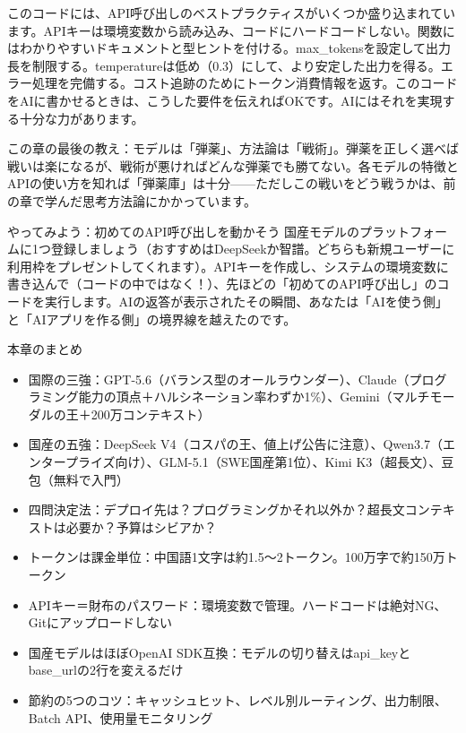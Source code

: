 このコードには、API呼び出しのベストプラクティスがいくつか盛り込まれています。APIキーは環境変数から読み込み、コードにハードコードしない。関数にはわかりやすいドキュメントと型ヒントを付ける。max\_tokensを設定して出力長を制限する。temperatureは低め（0.3）にして、より安定した出力を得る。エラー処理を完備する。コスト追跡のためにトークン消費情報を返す。このコードをAIに書かせるときは、こうした要件を伝えればOKです。AIにはそれを実現する十分な力があります。

この章の最後の教え：モデルは「弾薬」、方法論は「戦術」。弾薬を正しく選べば戦いは楽になるが、戦術が悪ければどんな弾薬でも勝てない。各モデルの特徴とAPIの使い方を知れば「弾薬庫」は十分——ただしこの戦いをどう戦うかは、前の章で学んだ思考方法論にかかっています。

\begin{tcbpractice}{やってみよう：初めてのAPI呼び出しを動かそう}
国産モデルのプラットフォームに1つ登録しましょう（おすすめはDeepSeekか智譜。どちらも新規ユーザーに利用枠をプレゼントしてくれます）。APIキーを作成し、システムの環境変数に書き込んで（コードの中ではなく！）、先ほどの「初めてのAPI呼び出し」のコードを実行します。AIの返答が表示されたその瞬間、あなたは「AIを使う側」と「AIアプリを作る側」の境界線を越えたのです。

\end{tcbpractice}

\begin{tcbsummary}{本章のまとめ}
\begin{itemize}
  \item 国際の三強：GPT-5.6（バランス型のオールラウンダー）、Claude（プログラミング能力の頂点＋ハルシネーション率わずか1\%）、Gemini（マルチモーダルの王＋200万コンテキスト）
  \item 国産の五強：DeepSeek V4（コスパの王、値上げ公告に注意）、Qwen3.7（エンタープライズ向け）、GLM-5.1（SWE国産第1位）、Kimi K3（超長文）、豆包（無料で入門）
  \item 四問決定法：デプロイ先は？プログラミングかそれ以外か？超長文コンテキストは必要か？予算はシビアか？
  \item トークンは課金単位：中国語1文字は約1.5〜2トークン。100万字で約150万トークン
  \item APIキー＝財布のパスワード：環境変数で管理。ハードコードは絶対NG、Gitにアップロードしない
  \item 国産モデルはほぼOpenAI SDK互換：モデルの切り替えはapi\_keyとbase\_urlの2行を変えるだけ
  \item 節約の5つのコツ：キャッシュヒット、レベル別ルーティング、出力制限、Batch API、使用量モニタリング
\end{itemize}

\end{tcbsummary}
